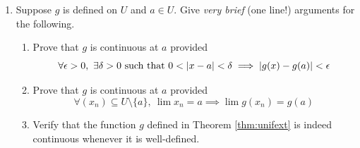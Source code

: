\begin{exercisessec}{}{}
\begin{enumerate}
% 	  


		\item Suppose $g$ is defined on $U$ and $a\in U$. Give \emph{very brief} (one line!) arguments for the following.
		\begin{enumerate}
		  \item Prove that $g$ is continuous at $a$ provided
		  \[\forall \epsilon>0,\ \exists \delta>0\text{ such that }0<\left| x-a\right|<\delta\implies\left| g(x)-g(a)\right|<\epsilon\]
		  \item Prove that $g$ is continuous at $a$ provided
		  \[\forall (x_n)\subseteq U\setminus\{a\},\ \lim x_n=a\implies \lim g(x_n)=g(a)\]
		  \item Verify that the function $g$ defined in Theorem \ref{thm:unifext} is indeed continuous whenever it is well-defined.
		\end{enumerate}



\end{enumerate}
\end{exercisessec}
